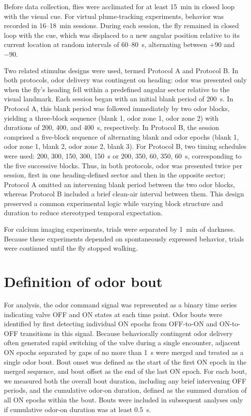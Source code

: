 Before data collection, flies were acclimated for at least 15~min in closed loop with the visual cue. For virtual plume-tracking experiments, behavior was recorded in 16--18~min sessions. During each session, the fly remained in closed loop with the cue, which was displaced to a new angular position relative to its current location at random intervals of 60--80~s, alternating between $+90$\textdegree{} and $-90$\textdegree{}.

Two related stimulus designs were used, termed Protocol A and Protocol B. In both protocols, odor delivery was contingent on heading: odor was presented only when the fly's heading fell within a predefined angular sector relative to the visual landmark. Each session began with an initial blank period of 200~s. In Protocol A, this blank period was followed immediately by two odor blocks, yielding a three-block sequence (blank 1, odor zone 1, odor zone 2) with durations of 200, 400, and 400~s, respectively. In Protocol B, the session comprised a five-block sequence of alternating blank and odor epochs (blank 1, odor zone 1, blank 2, odor zone 2, blank 3). For Protocol B, two timing schedules were used: 200, 300, 150, 300, 150~s or 200, 350, 60, 350, 60~s, corresponding to the five successive blocks. Thus, in both protocols, odor was presented twice per session, first in one heading-defined sector and then in the opposite sector; Protocol A omitted an intervening blank period between the two odor blocks, whereas Protocol B included a brief clean-air interval between them. This design preserved a common experimental logic while varying block structure and duration to reduce stereotyped temporal expectation.

For calcium imaging experiments, trials were separated by 1~min of darkness. Because these experiments depended on spontaneously expressed behavior, trials were continued until the fly stopped walking.

\section{Definition of odor bout}

For analysis, the odor command signal was represented as a binary time series indicating valve OFF and ON states at each time point. Odor bouts were identified by first detecting individual ON epochs from OFF-to-ON and ON-to-OFF transitions in this signal. Because behaviorally contingent odor delivery often generated rapid switching of the valve during a single encounter, adjacent ON epochs separated by gaps of no more than 1~s were merged and treated as a single odor bout. Bout onset was defined as the start of the first ON epoch in the merged sequence, and bout offset as the end of the last ON epoch. For each bout, we measured both the overall bout duration, including any brief intervening OFF periods, and the cumulative odor-on duration, defined as the summed duration of all ON epochs within the bout. Bouts were included in subsequent analyses only if cumulative odor-on duration was at least 0.5~s.

